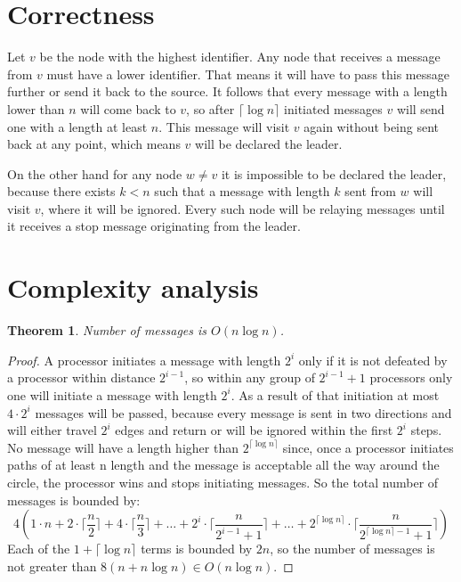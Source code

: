\documentclass[a4paper,12pt]{article}
\newtheorem{theorem}{Theorem}
\begin{document}
\section{Correctness}
Let $v$ be the node with the highest identifier. Any node that receives a message from $v$ must have a lower identifier. That means it will have to pass this message further or send it back to the source. It follows that every message with a length lower than $n$ will come back to $v$, so after $\lceil\log n\rceil$ initiated messages $v$ will send one with a length at least $n$. This message will visit $v$ again without being sent back at any point, which means $v$ will be declared the leader.\par
On the other hand for any node $w\neq v$ it is impossible to be declared the leader, because there exists $k<n$ such that a message with length $k$ sent from $w$ will visit $v$, where it will be ignored. Every such node will be relaying messages until it receives a stop message originating from the leader.

\section{Complexity analysis}
\begin{theorem}
Number of messages is $O(n\log n)$.
\end{theorem}
\begin{proof}
A processor initiates a message with length $2^i$ only if it is not defeated by a processor within distance $2^{i-1}$, so within any group of $2^{i-1}+1$ processors only one will initiate a message with length $2^i$. As a result of that initiation at most $4\cdot2^i$ messages will be passed, because every message is sent in two directions and will either travel $2^i$ edges and return or will be ignored within the first $2^i$ steps. No message will have a length higher than $2^{\lceil\log n\rceil}$ since, once a processor initiates paths of at least n length
and the message is acceptable all the way around the
circle, the processor wins and stops initiating messages. So the total number of messages is bounded by:
$$4(1\cdot n +2\cdot\lceil\frac{n}{2}\rceil+4\cdot\lceil\frac{n}{3}\rceil+\dots+2^i\cdot\lceil\frac{n}{2^{i-1}+1}\rceil+\dots+2^{\lceil\log n\rceil}\cdot\lceil\frac{n}{2^{\lceil\log n\rceil-1}+1}\rceil)$$
Each of the $1+\lceil\log n\rceil$ terms is bounded by $2n$, so the number of messages is not greater than $8(n+n\log n)\in O(n\log n)$.
\end{proof}

\printbibliography
\end{document}
